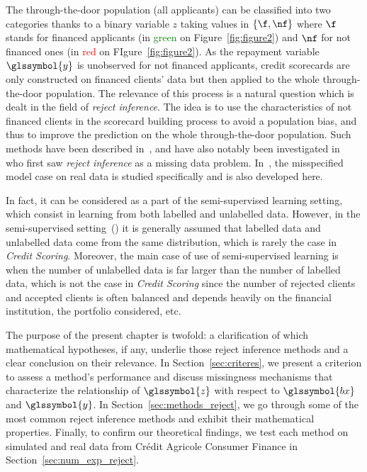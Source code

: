 The through-the-door population (all applicants) can be classified into two categories thanks to a binary variable $z$ taking values in $\{\f,\nf\}$ where $\f$ stands for financed applicants (in \textcolor{green}{green} on Figure~\ref{fig:figure2}) and $\nf$ for not financed ones (in \textcolor{red}{red} on FIgure~\ref{fig:figure2}). As the repayment variable $\glssymbol{y}$ is unobserved for not financed applicants, credit scorecards are only constructed on financed clients' data but then applied to the whole  through-the-door population. The relevance of this process is a natural question which is dealt in the field of \textit{reject inference}. The idea is to use the characteristics of not financed clients in the scorecard building process to avoid a population bias, and thus to improve the prediction on the whole through-the-door population. Such methods have been described in~\cite{RI6,saporta,banasik,economix}, and have also notably been investigated in~\cite{RI2} who first saw \textit{reject inference} as a missing data problem. In~\cite{RI3}, the misspecified model case on real data is studied specifically and is also developed here.


In fact, it can be considered as a part of the semi-supervised learning setting, which consist in learning from both labelled and unlabelled data. However, in the semi-supervised setting~(\cite{ChaSchZie06}) it is generally assumed that labelled data and unlabelled data come from the same distribution, which is rarely the case in \textit{Credit Scoring}. Moreover, the main case of use of semi-supervised learning is when the number of unlabelled data is far larger than the number of labelled data, which is not the case in \textit{Credit Scoring} since the number of rejected clients and accepted clients is often balanced and depends heavily on the financial institution, the portfolio considered, etc.


The purpose of the present chapter is twofold: a clarification of which mathematical hypotheses, if any, underlie those reject inference methods and a clear conclusion on their relevance. In Section~\ref{sec:criteres}, we present a criterion to assess a method's performance and discuss missingness mechanisms that characterize the relationship of $\glssymbol{z}$ with respect to $\glssymbol{bx}$ and $\glssymbol{y}$. In Section~\ref{sec:methods_reject}, we go through some of the most common reject inference methods and exhibit their mathematical properties. Finally, to confirm our theoretical findings, we test each method on simulated and real data from Crédit Agricole Consumer Finance in Section~\ref{sec:num_exp_reject}.

